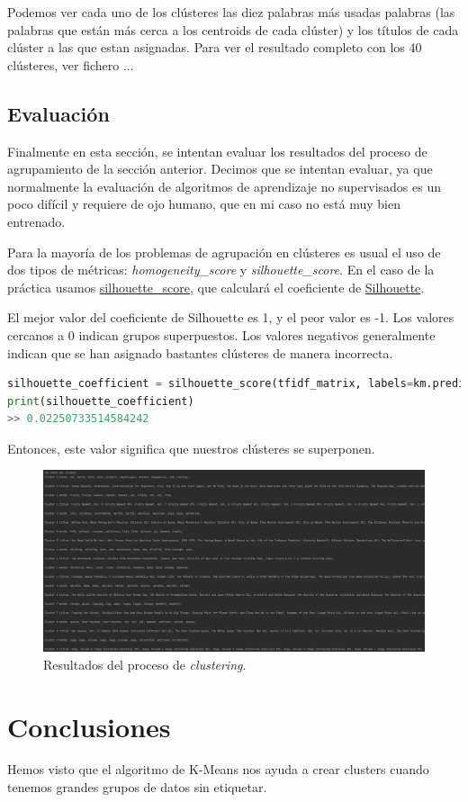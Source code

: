 \documentclass{uimppracticas}
\begin{document}
Podemos ver cada uno de los clústeres las diez palabras más usadas palabras (las palabras que están más cerca a los centroids de cada clúster) y los títulos de cada clúster a las que estan asignadas. Para ver el resultado completo con los 40 clústeres, ver fichero ...

\subsection{Evaluación}

Finalmente en esta sección, se intentan evaluar los resultados del proceso de agrupamiento de la sección anterior. Decimos que se intentan evaluar, ya que normalmente la evaluación de algoritmos de aprendizaje no supervisados es un poco difícil y requiere de ojo humano, que en mi caso no está muy bien entrenado.
 
Para la mayoría de los problemas de agrupación en clústeres es usual el uso de dos tipos de métricas: \textit{homogeneity\_score} y \textit{silhouette\_score}. En el caso de la práctica usamos \href{https://scikit-learn.org/stable/modules/generated/sklearn.metrics.silhouette_score.html}{silhouette\_score}, que calculará el coeficiente de \href{https://es.wikipedia.org/wiki/Silhouette_(clustering)}{Silhouette}.

El mejor valor del coeficiente de Silhouette es 1, y el peor valor es -1. Los valores cercanos a 0 indican grupos superpuestos. Los valores negativos generalmente indican que se han asignado bastantes clústeres de manera incorrecta.

\begin{lstlisting}[language=python]
silhouette_coefficient = silhouette_score(tfidf_matrix, labels=km.predict(tfidf_matrix))
print(silhouette_coefficient)
>> 0.02250733514584242
\end{lstlisting}

Entonces, este valor significa que nuestros clústeres se superponen. 

\begin{figure}[h]
	\centering
	\includegraphics[scale=0.35]{images/results}
	\caption{Resultados del proceso de \textit{clustering}.}
	\label{results}
\end{figure}

\section{Conclusiones}

Hemos visto que el algoritmo de K-Means nos ayuda a crear clusters cuando tenemos grandes grupos de datos sin etiquetar.

\renewcommand{\refname}{Bibliografía}


\end{document}
